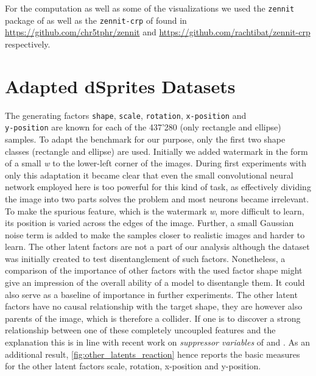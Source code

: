 For the computation as well as some of the visualizations we used the \verb|zennit| package of \cite{Anders2021} as well as the \verb|zennit-crp| of \cite{Achtibat2023} found in 
\url{https://github.com/chr5tphr/zennit} and \url{https://github.com/rachtibat/zennit-crp} respectively.

\section{Adapted dSprites Datasets}\label{appendix:dsprites}

The generating factors \verb|shape|, \verb|scale|, \verb|rotation|, \verb|x-position| and \\
\verb|y-position| are known for each of the 437'280 (only rectangle and ellipse) samples. 
To adapt the benchmark for our purpose, only the first two shape classes (rectangle and ellipse) are used. 
Initially we added watermark in the form of a small \textit{w} to the lower-left corner of the images. During first experiments with only this adaptation it became clear that even the small convolutional neural network employed here is too powerful for this kind of task, as effectively dividing the image into two parts solves the problem and most neurons became irrelevant.
To make the spurious feature, which is the watermark \textit{w}, more difficult to learn, its position is varied across the edges of the image. Further, a small Gaussian noise term is added to make the samples closer to realistic images and harder to learn. The other latent factors are not a part of our analysis although the dataset was initially created to test disentanglement of such factors. Nonetheless, a comparison of the importance of other factors with the used factor shape might give an impression of the overall ability of a model to disentangle them. It could also serve as a baseline of importance in further experiments. The other latent factors have no causal relationship with the target shape, they are however also parents of the image, which is therefore a collider. If one is to discover a strong relationship between one of these completely uncoupled features and the explanation this is in line with recent work on \textit{suppressor variables} of  \citet{Wilming2023} and \citet{Clark2023}. As an additional result, \cref{fig:other_latents_reaction} hence reports the basic measures for the other latent factors scale, rotation, x-position and y-position. 

